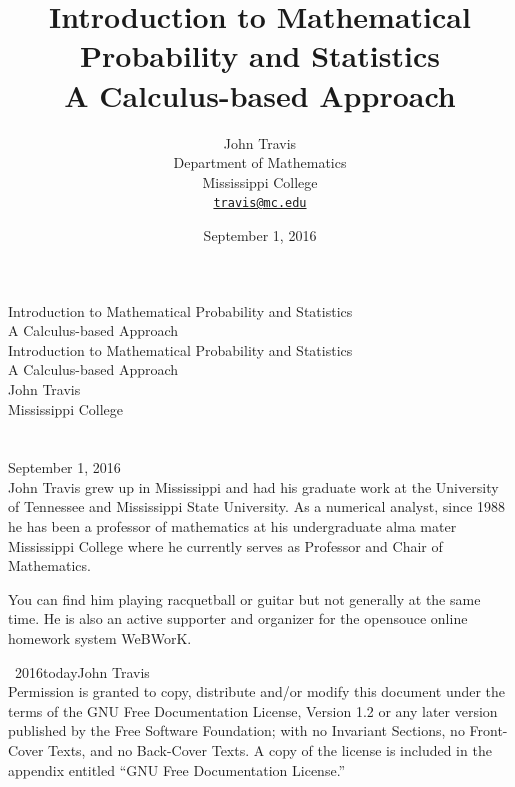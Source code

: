 \documentclass[10pt,]{book}
\title{Introduction to Mathematical Probability and Statistics\\
{\large A Calculus-based Approach}}
\author{John Travis\\
Department of Mathematics\\
Mississippi College\\
\href{mailto:travis@mc.edu}{\nolinkurl{travis@mc.edu}}
}
\date{September 1, 2016}
\theoremstyle{plain}
\theoremstyle{definition}
\theoremstyle{definition}
\numberwithin{equation}{section}
\begin{document}
\frontmatter
\thispagestyle{empty}
{\centering
\vspace*{0.28\textheight}
{\Huge Introduction to Mathematical Probability and Statistics}\\[2\baselineskip]
{\LARGE A Calculus-based Approach}\\
}
\clearpage
\thispagestyle{empty}
\null%
\clearpage
\thispagestyle{empty}
{\centering
\vspace*{0.14\textheight}
{\Huge Introduction to Mathematical Probability and Statistics}\\[\baselineskip]
{\LARGE A Calculus-based Approach}\\[3\baselineskip]
{\Large John Travis}\\[0.5\baselineskip]
{\Large Mississippi College}\\[3\baselineskip]
{\Large }\\[0.5\baselineskip]
{\normalsize }\\[3\baselineskip]
{\Large September 1, 2016}\\}
\clearpage
\thispagestyle{empty}
\noindent
John Travis grew up in Mississippi and had his graduate work at the University of Tennessee and Mississippi State University. As a numerical analyst, since 1988 he has been a professor of mathematics at his undergraduate alma mater Mississippi College where he currently serves as Professor and Chair of Mathematics.%
\par
You can find him playing racquetball or guitar but not generally at the same time. He is also an active supporter and organizer for the opensouce online homework system WeBWorK.%
\par
{}
\noindent\textcopyright\ 2016\textendash{}today\quad{}John Travis\\[0.5\baselineskip]
Permission is granted to copy, distribute and/or modify this document under the terms of the GNU Free Documentation License, Version 1.2 or any later version published by the Free Software Foundation; with no Invariant Sections, no Front-Cover Texts, and no Back-Cover Texts.  A copy of the license is included in the appendix entitled ``GNU Free Documentation License.''\par
{}
\null\clearpage
\end{document}
